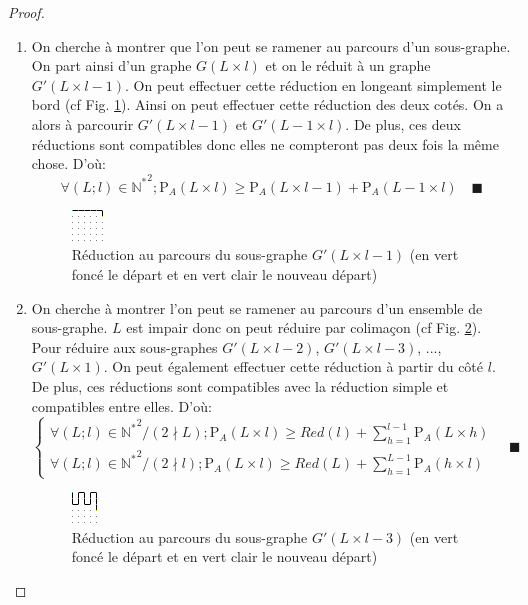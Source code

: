 \documentclass[twoside, a4paper, 12pt]{report}
\newcommand{\cqfd}[1][\quad]{\ensuremath{#1\blacksquare}}
\newcommand{\pa}[2]{\ensuremath{\text{P}_A\left(#1 \times #2\right)}}
\begin{document}
\begin{proof}
\begin{enumerate}
\item On cherche à montrer que l'on peut se ramener au parcours d'un sous-graphe. On part ainsi d'un graphe $G(L \times l)$ et on le réduit à un graphe $G'(L \times l-1)$. On peut effectuer cette réduction en longeant simplement le bord (cf Fig. \ref{red_simple}). Ainsi on peut effectuer cette réduction des deux cotés. On a alors à parcourir $G'(L \times l-1)$ et $G'(L-1 \times l)$. De plus, ces deux réductions sont compatibles donc elles ne compteront pas deux fois la même chose. D'où: 
\[\forall (L; l) \in \mathbb{N^*}^2; \pa{L}{l} \geq \pa{L}{l-1} + \pa{L-1}{l} 
\cqfd\]

\begin{figure}[h]
\centering\includegraphics[scale=5]{red_simple.png}
\caption[Réduction au parcours du sous-graphe $G'(L\times l-1)$]{Réduction au parcours du sous-graphe $G'(L\times l-1)$ (en vert foncé le départ et en vert clair le nouveau départ)}
\label{red_simple}
\end{figure}

\item On cherche à montrer l'on peut se ramener au parcours d'un ensemble de sous-graphe. $L$ est impair donc on peut réduire par colimaçon (cf Fig. \ref{red_impair_coli}). Pour réduire aux sous-graphes $G'(L \times l-2)$, $G'(L \times l-3)$, ..., $G'(L \times 1)$. On peut également effectuer cette réduction à partir du côté $l$. De plus, ces réductions sont compatibles avec la réduction simple et compatibles entre elles. D'où:
\[\left\{\begin{array}{ll}
\forall (L; l) \in \mathbb{N^*}^2 /( 2\nmid L); \pa{L}{l} \geq Red(l) + \sum_{h=1}^{l-1}\pa{L}{h}\\
\forall (L; l) \in \mathbb{N^*}^2 /( 2\nmid l); \pa{L}{l} \geq Red(L) + \sum_{h=1}^{L-1}\pa{h}{l}
\end{array}\right. 
\cqfd\]

\begin{figure}[h]
\centering\includegraphics[scale=5]{red_impair_coli.png}
\caption[Réduction au parcours du sous-graphe  $G'(L\times l-3)$]{Réduction au parcours du sous-graphe  $G'(L\times l-3)$ (en vert foncé le départ et en vert clair le nouveau départ)}
\label{red_impair_coli}
\end{figure}


\end{enumerate}
\end{proof}
\end{document}
